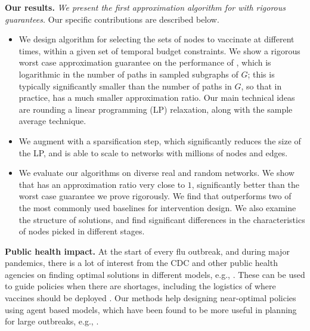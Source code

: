 \noindent
\textbf{Our results.}
\emph{We present the first approximation algorithm for \prob{} with rigorous guarantees.}
Our specific contributions are described below.
\begin{itemize}
\item
We design algorithm \algo{} for selecting the sets of nodes to vaccinate at different times,
within a given set of temporal budget constraints. We show a rigorous worst case approximation guarantee on
the performance of \algo{}, which is logarithmic in the number of paths in sampled subgraphs of $G$;
this is typically significantly smaller than the number of paths in $G$, so that
in practice, \algo{} has a much smaller approximation ratio.
Our main technical ideas are rounding a linear programming (LP) relaxation, along with the sample average technique.
\item
We augment \algo{} with a sparsification step, which significantly reduces the size of the LP, and
is able to scale to networks with millions of nodes and edges.
\item 
We evaluate our algorithms on diverse real and random networks.
We show that \algo{} has an approximation ratio very close to $1$, significantly better than the worst case guarantee we prove rigorously. 
We find that \algo{} outperforms two of the most commonly used baselines for intervention design.
We also examine the structure of solutions, and find significant differences in the characteristics of nodes
picked in different stages.
\end{itemize}

\noindent
\textbf{Public health impact.}
At the start of every flu outbreak, and during major pandemics, there is a lot of interest from the CDC and other public health agencies on finding optimal solutions in different models, e.g., \cite{medlock:science09,halloran:pnas08,lofgren:pnas14,venkataramanan:ichi17}. These can be used to guide policies when there are shortages, including the logistics of where vaccines should be deployed \cite{venkataramanan:ichi17}. Our methods help designing near-optimal policies using agent based models, which have been found to be more useful in planning for large outbreaks, e.g., \cite{halloran:pnas08,lofgren:pnas14,eubank:nature04,gk06}.


